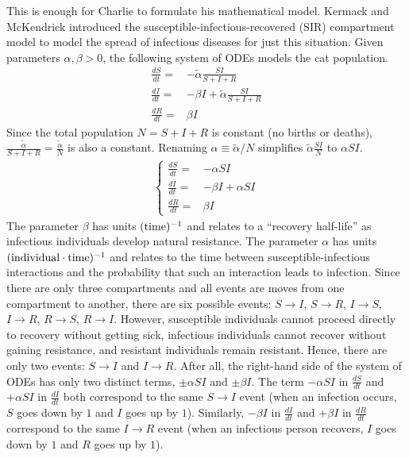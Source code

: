 \begin{example}
This is enough for Charlie to formulate his mathematical model.
Kermack and McKendrick \cite{kermack1927contribution} introduced the susceptible-infectious-recovered (SIR) compartment model to model the spread of infectious diseases for just this situation.
Given parameters $\alpha, \beta > 0$, the following system of ODEs models the cat population.
\begin{align*}
\frac{dS}{dt} =& -\widetilde{\alpha} \frac{SI}{S+I+R}\\
\frac{dI}{dt} =& -\beta I + \widetilde{\alpha} \frac{SI}{S+I+R}\\
\frac{dR}{dt} =& \beta I
\end{align*}
Since the total population $N = S+I+R$ is constant (no births or deaths), $\frac{\widetilde{\alpha}}{S+I+R} = \frac{\widetilde{\alpha}}{N}$ is also a constant. Renaming $\alpha \equiv \widetilde{\alpha}/N$ simplifies $\widetilde{\alpha}\frac{SI}{N}$ to $\alpha SI$.
\begin{align}\label{eqn:sir}
\begin{cases}\frac{dS}{dt} =& -\alpha SI\\
\frac{dI}{dt} =& -\beta I + \alpha SI\\
\frac{dR}{dt} =& \beta I
\end{cases}
\end{align}
The parameter $\beta$ has units $(\textup{time})^{-1}$ and relates to a ``recovery half-life'' as infectious individuals develop natural resistance.
The parameter $\alpha$ has units $(\textup{individual}\cdot\textup{time})^{-1}$ and relates to the time between susceptible-infectious interactions and the probability that such an interaction leads to infection.
Since there are only three compartments and all events are moves from one compartment to another, there are six possible events: $S \to I$, $S \to R$, $I \to S$, $I \to R$, $R \to S$, $R \to I$.
However, susceptible individuals cannot proceed directly to recovery without getting sick, infectious individuals cannot recover without gaining resistance, and resistant individuals remain resistant.
Hence, there are only two events: $S \to I$ and $I \to R$.
After all, the right-hand side of the system of ODEs has only two distinct terms, $\pm \alpha SI$ and $\pm \beta I$.
The term $-\alpha SI$ in $\frac{dS}{dt}$ and $+\alpha SI$ in $\frac{dI}{dt}$ both correspond to the same $S \to I$ event (when an infection occurs, $S$ goes down by $1$ and $I$ goes up by $1$).
Similarly, $-\beta I$ in $\frac{dI}{dt}$ and $+\beta I$ in $\frac{dR}{dt}$ correspond to the same $I \to R$ event (when an infectious person recovers, $I$ goes down by $1$ and $R$ goes up by $1$).


\end{example}

